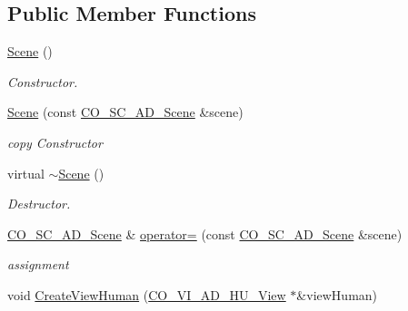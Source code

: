 \subsection*{Public Member Functions}
\begin{DoxyCompactItemize}
\item 
\hypertarget{classContent_1_1Scene_1_1Admin_1_1Scene_afb9bb2b9756a3da24387d209d954ecc6}{
\hyperlink{classContent_1_1Scene_1_1Admin_1_1Scene_afb9bb2b9756a3da24387d209d954ecc6}{Scene} ()}
\label{classContent_1_1Scene_1_1Admin_1_1Scene_afb9bb2b9756a3da24387d209d954ecc6}

\begin{DoxyCompactList}\small\item\em Constructor. \item\end{DoxyCompactList}\item 
\hypertarget{classContent_1_1Scene_1_1Admin_1_1Scene_a6302cdae107f1943d86112e1ab5aabd6}{
\hyperlink{classContent_1_1Scene_1_1Admin_1_1Scene_a6302cdae107f1943d86112e1ab5aabd6}{Scene} (const \hyperlink{classContent_1_1CO__SC__AD__Scene}{CO\_\-SC\_\-AD\_\-Scene} \&scene)}
\label{classContent_1_1Scene_1_1Admin_1_1Scene_a6302cdae107f1943d86112e1ab5aabd6}

\begin{DoxyCompactList}\small\item\em copy Constructor \item\end{DoxyCompactList}\item 
\hypertarget{classContent_1_1Scene_1_1Admin_1_1Scene_a4bc036b7a76b0807c5aed99185dd1bdb}{
virtual \hyperlink{classContent_1_1Scene_1_1Admin_1_1Scene_a4bc036b7a76b0807c5aed99185dd1bdb}{$\sim$Scene} ()}
\label{classContent_1_1Scene_1_1Admin_1_1Scene_a4bc036b7a76b0807c5aed99185dd1bdb}

\begin{DoxyCompactList}\small\item\em Destructor. \item\end{DoxyCompactList}\item 
\hypertarget{classContent_1_1Scene_1_1Admin_1_1Scene_a99e0edfa5275104075b10d6db0421b7c}{
\hyperlink{classContent_1_1CO__SC__AD__Scene}{CO\_\-SC\_\-AD\_\-Scene} \& \hyperlink{classContent_1_1Scene_1_1Admin_1_1Scene_a99e0edfa5275104075b10d6db0421b7c}{operator=} (const \hyperlink{classContent_1_1CO__SC__AD__Scene}{CO\_\-SC\_\-AD\_\-Scene} \&scene)}
\label{classContent_1_1Scene_1_1Admin_1_1Scene_a99e0edfa5275104075b10d6db0421b7c}

\begin{DoxyCompactList}\small\item\em assignment \item\end{DoxyCompactList}\item 
void \hyperlink{classContent_1_1Scene_1_1Admin_1_1Scene_a2ff8b2787231305b94b63a6d698eeea7}{CreateViewHuman} (\hyperlink{classContent_1_1View_1_1Admin_1_1Human_1_1View}{CO\_\-VI\_\-AD\_\-HU\_\-View} $\ast$\&viewHuman)
\end{DoxyCompactItemize}
